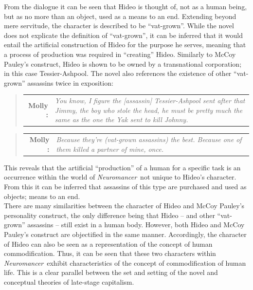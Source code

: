 \documentclass[11pt]{article}
\newcommand\neuro{\textit{Neuromancer}}
\begin{document}
	From the dialogue it can be seen that Hideo is thought of, not as a human being, but as no more than an object, used as a means to an end. Extending beyond mere servitude, the character is described to be ``vat-grown''. While the novel does not explicate the definition of ``vat-grown'', it can be inferred that it would entail the artificial construction of Hideo for the purpose he serves, meaning that a process of production was required in ``creating'' Hideo. Similarly to McCoy Pauley’s construct, Hideo is shown to be owned by a transnational corporation; in this case Tessier-Ashpool. The novel also references the existence of other ``vat-grown'' assassins twice in exposition:
	\begin{quote}
		\begin{tabular}{>{\bf}r<{:}>{\it}p{10cm}}
			Molly & You know, I figure the [assassin] Tessier-Ashpool sent after that Jimmy, the boy who stole the head, he must be pretty much the same as the one the Yak sent to kill Johnny.\\
		\end{tabular}
		\flushright{--\neuro: p. 197}
	\end{quote}
	\begin{quote}
		\begin{tabular}{>{\bf}r<{:}>{\it}p{10cm}}
			Molly & Because they’re \emph{(vat-grown assassins)} the best. Because one of them killed a partner of mine, once.\\
		\end{tabular}
		\flushright{--\neuro: p. 241}
	\end{quote}
	This reveals that the artificial ``production'' of a human for a specific task is an occurrence within the world of \neuro\ not unique to Hideo's character. From this it can be inferred that assassins of this type are purchased and used as objects; means to an end.\\
	\smallbreak\noindent
	There are many similarities between the character of Hideo and McCoy Pauley’s personality construct, the only difference being that Hideo – and other ``vat-grown'' assassins – still exist in a human body. However, both Hideo and McCoy Pauley’s construct are objectified in the same manner. Accordingly, the character of Hideo can also be seen as a representation of the concept of human commodification. Thus, it can be seen that these two characters within \neuro\ exhibit characteristics of the concept of commodification of human life. This is a clear parallel between the set and setting of the novel and conceptual theories of late-stage capitalism.
	
\end{document}
